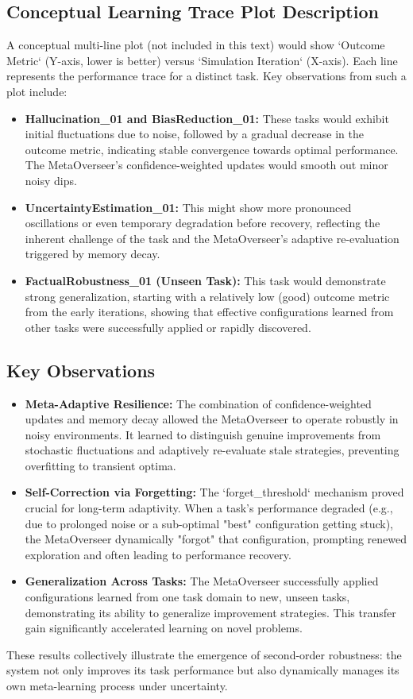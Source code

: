 \documentclass{article}
\begin{document}
\subsection{Conceptual Learning Trace Plot Description}
A conceptual multi-line plot (not included in this text) would show `Outcome Metric` (Y-axis, lower is better) versus `Simulation Iteration` (X-axis). Each line represents the performance trace for a distinct task. Key observations from such a plot include:
\begin{itemize}
    \item \textbf{Hallucination\_01 and BiasReduction\_01:} These tasks would exhibit initial fluctuations due to noise, followed by a gradual decrease in the outcome metric, indicating stable convergence towards optimal performance. The MetaOverseer's confidence-weighted updates would smooth out minor noisy dips.
    \item \textbf{UncertaintyEstimation\_01:} This might show more pronounced oscillations or even temporary degradation before recovery, reflecting the inherent challenge of the task and the MetaOverseer's adaptive re-evaluation triggered by memory decay.
    \item \textbf{FactualRobustness\_01 (Unseen Task):} This task would demonstrate strong generalization, starting with a relatively low (good) outcome metric from the early iterations, showing that effective configurations learned from other tasks were successfully applied or rapidly discovered.
\end{itemize}

\subsection{Key Observations}
\begin{itemize}
    \item \textbf{Meta-Adaptive Resilience:} The combination of confidence-weighted updates and memory decay allowed the MetaOverseer to operate robustly in noisy environments. It learned to distinguish genuine improvements from stochastic fluctuations and adaptively re-evaluate stale strategies, preventing overfitting to transient optima.
    \item \textbf{Self-Correction via Forgetting:} The `forget_threshold` mechanism proved crucial for long-term adaptivity. When a task's performance degraded (e.g., due to prolonged noise or a sub-optimal "best" configuration getting stuck), the MetaOverseer dynamically "forgot" that configuration, prompting renewed exploration and often leading to performance recovery.
    \item \textbf{Generalization Across Tasks:} The MetaOverseer successfully applied configurations learned from one task domain to new, unseen tasks, demonstrating its ability to generalize improvement strategies. This transfer gain significantly accelerated learning on novel problems.
\end{itemize}
These results collectively illustrate the emergence of second-order robustness: the system not only improves its task performance but also dynamically manages its own meta-learning process under uncertainty.
\end{document}
